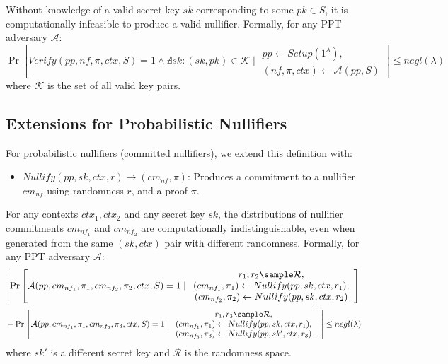 \begin{property}
Without knowledge of a valid secret key $sk$ corresponding to some $pk \in S$, it is computationally infeasible to produce a valid nullifier. Formally, for any PPT adversary $\mathcal{A}$:
$$\Pr\left[Verify(pp, nf, \pi, ctx, S) = 1 \land \nexists sk: (sk,pk) \in \mathcal{K} \mid \begin{array}{c} pp \leftarrow Setup(1^\lambda), \\ (nf, \pi, ctx) \leftarrow \mathcal{A}(pp, S) \end{array}\right] \leq negl(\lambda)$$
where $\mathcal{K}$ is the set of all valid key pairs.
\end{property}

\subsection{Extensions for Probabilistic Nullifiers}

For probabilistic nullifiers (committed nullifiers), we extend this definition with:

\begin{itemize}
    \item $Nullify(pp, sk, ctx, r) \rightarrow (cm_{nf}, \pi)$: Produces a commitment to a nullifier $cm_{nf}$ using randomness $r$, and a proof $\pi$.
\end{itemize}

\begin{property}[Unlinkability]
For any contexts $ctx_1, ctx_2$ and any secret key $sk$, the distributions of nullifier commitments $cm_{nf_1}$ and $cm_{nf_2}$ are computationally indistinguishable, even when generated from the same $(sk, ctx)$ pair with different randomness. Formally, for any PPT adversary $\mathcal{A}$:
$$\left|\Pr\left[\mathcal{A}(pp, cm_{nf_1}, \pi_1, cm_{nf_2}, \pi_2, ctx, S) = 1 \mid \begin{array}{c} 
r_1, r_2 \sample \mathcal{R}, \\ 
(cm_{nf_1}, \pi_1) \leftarrow Nullify(pp, sk, ctx, r_1), \\
(cm_{nf_2}, \pi_2) \leftarrow Nullify(pp, sk, ctx, r_2)
\end{array}\right]\right.$$
$$\left. - \Pr\left[\mathcal{A}(pp, cm_{nf_1}, \pi_1, cm_{nf_3}, \pi_3, ctx, S) = 1 \mid \begin{array}{c} 
r_1, r_3 \sample \mathcal{R}, \\ 
(cm_{nf_1}, \pi_1) \leftarrow Nullify(pp, sk, ctx, r_1), \\
(cm_{nf_3}, \pi_3) \leftarrow Nullify(pp, sk', ctx, r_3)
\end{array}\right]\right| \leq negl(\lambda)$$
where $sk'$ is a different secret key and $\mathcal{R}$ is the randomness space.
\end{property}





















